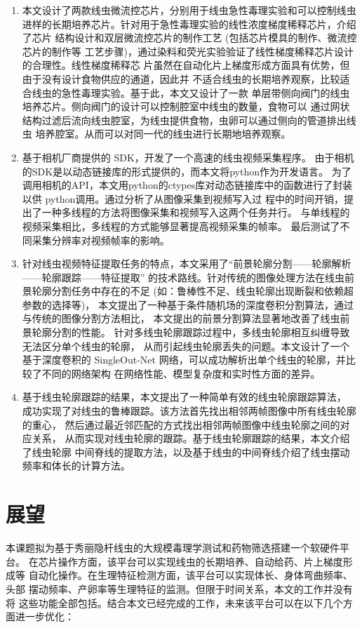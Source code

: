 	\begin{enumerate}[label={(\arabic*)},font={\color{black!50!black}\bfseries}]
	\item 本文设计了两款线虫微流控芯片，分别用于线虫急性毒理实验和可以控制线虫
	进样的长期培养芯片。针对用于急性毒理实验的线性浓度梯度稀释芯片，介绍了芯片
	结构设计和双层微流控芯片的制作工艺 (包括芯片模具的制作、微流控芯片的制作等
	工艺步骤)，通过染料和荧光实验验证了线性梯度稀释芯片设计的合理性。线性梯度稀释芯
	片虽然在自动化片上梯度形成方面具有优势，但由于没有设计食物供应的通道，因此并
	不适合线虫的长期培养观察，比较适合线虫的急性毒理实验。基于此，本文又设计了一款
	单层带侧向阀门的线虫培养芯片。侧向阀门的设计可以控制腔室中线虫的数量，食物可以
	通过网状结构过滤后流向线虫腔室，为线虫提供食物，虫卵可以通过侧向的管道排出线虫
	培养腔室。从而可以对同一代的线虫进行长期地培养观察。
	\item 基于相机厂商提供的 SDK，开发了一个高速的线虫视频采集程序。
	由于相机的SDK是以动态链接库的形式提供的，而本文将python作为开发语言。
	为了调用相机的API，本文用python的ctypes库对动态链接库中的函数进行了封装以供
	python调用。通过分析了从图像采集到视频写入过
	程中的时间开销，提出了一种多线程的方法将图像采集和视频写入这两个任务并行。
	与单线程的视频采集相比，多线程的方式能够显著提高视频采集的帧率。
	最后测试了不同采集分辨率对视频帧率的影响。
	\item 针对线虫视频特征提取任务的特点，本文采用了“前景轮廓分割——轮廓解析——轮廓跟踪——特征提取”
	的技术路线。针对传统的图像处理方法在线虫前景轮廓分割任务中存在的不足 
	(如：鲁棒性不足、线虫轮廓出现断裂和依赖超参数的选择等)，
	本文提出了一种基于条件随机场的深度卷积分割算法，通过与传统的图像分割方法相比，
	本文提出的前景分割算法显著地改善了线虫前景轮廓分割的性能。
针对多线虫轮廓跟踪过程中，多线虫轮廓相互纠缠导致无法区分单个线虫的轮廓，
从而引起线虫轮廓丢失的问题。本文设计了一个基于深度卷积的 
SingleOut-Net 网络，可以成功解析出单个线虫的轮廓，并比较了不同的网络架构
在网络性能、模型复杂度和实时性方面的差异。

	\item 基于线虫轮廓跟踪的结果，本文提出了一种简单有效的线虫轮廓跟踪算法，
	成功实现了对线虫的鲁棒跟踪。该方法首先找出相邻两帧图像中所有线虫轮廓的重心，
	然后通过最近邻匹配的方式找出相邻两帧图像中线虫轮廓之间的对应关系，
	从而实现对线虫轮廓的跟踪。基于线虫轮廓跟踪的结果，本文介绍了线虫轮廓
	中间脊线的提取方法，以及基于线虫的中间脊线介绍了线虫摆动频率和体长的计算方法。
	\end{enumerate}
	
\section{展望}
	本课题拟为基于秀丽隐杆线虫的大规模毒理学测试和药物筛选搭建一个软硬件平台。
	在芯片操作方面，该平台可以实现线虫的长期培养、自动给药、片上梯度形成等
	自动化操作。在生理特征检测方面，该平台可以实现体长、身体弯曲频率、头部
	摆动频率、产卵率等生理特征的监测。但限于时间关系，本文的工作并没有将
	这些功能全部包括。结合本文已经完成的工作，未来该平台可以在以下几个方面进一步优化：
	

